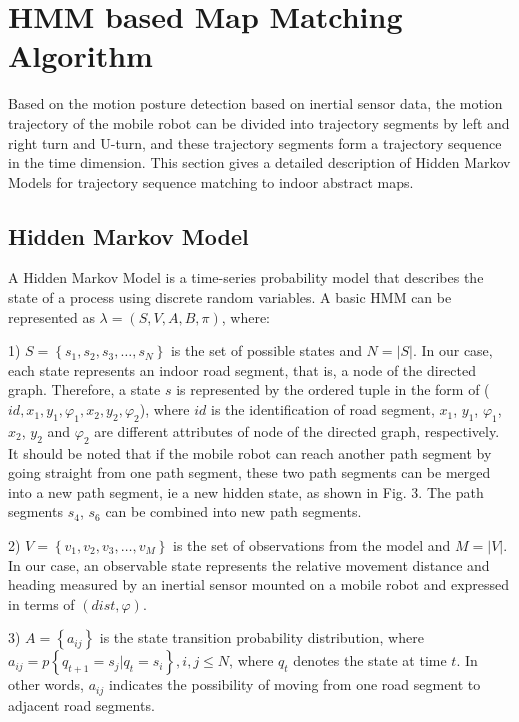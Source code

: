 \documentclass{llncs}
\begin{document}
\section{HMM based Map Matching Algorithm}

Based on the motion posture detection based on inertial sensor data, the motion trajectory of the mobile robot can be divided into trajectory segments by left and right turn and U-turn, and these trajectory segments form a trajectory sequence in the time dimension. This section gives a detailed description of Hidden Markov Models for trajectory sequence matching to indoor abstract maps.

\subsection{Hidden Markov Model}

A Hidden Markov Model is a time-series probability model that describes the state of a process using discrete random variables. A basic HMM can be represented as $\lambda  = (S,V,A,B,\pi)$, where:

1) $S = \left\{ {{s_1},{s_2},{s_3}, \ldots ,{s_N}} \right\}$ is the set of possible states and $N = \left| S \right|$. In our case, each state represents an indoor road segment, that is, a node of the directed graph. Therefore, a state $s$ is represented by the ordered tuple in the form of ($id,x_{1},y_{1},{\varphi}_{1},x_{2},y_{2},{\varphi}_{2}$), where $id$ is the identification of road segment, $x_{1}$, $y_{1}$, ${\varphi}_{1}$, $x_{2}$, $y_{2}$ and ${\varphi}_{2}$ are different attributes of node of the directed graph, respectively. It should be noted that if the mobile robot can reach another path segment by going straight from one path segment, these two path segments can be merged into a new path segment, ie a new hidden state, as shown in Fig. 3. The path segments $s_4$, $s_6$ can be combined into new path segments.

2) $V = \left\{ {{v_1},{v_2},{v_3}, \ldots ,{v_M}} \right\}$ is the set of observations from the model and $M = \left| V \right|$. In our case, an observable state represents the relative movement distance and heading measured by an inertial sensor mounted on a mobile robot and expressed in terms of $(dist,\varphi)$.

3) $A = \left\{ {{a_{ij}}} \right\}$ is the state transition probability distribution, where \\ ${a_{ij}} = p\left\{ {{q_{t + 1}} = {s_j}|{q_t} = {s_i}} \right\}, i, j \le N$, where ${q_t}$ denotes the state at time $t$. In other words, $a_{ij}$ indicates the possibility of moving from one road segment to adjacent road segments.
\end{document}
